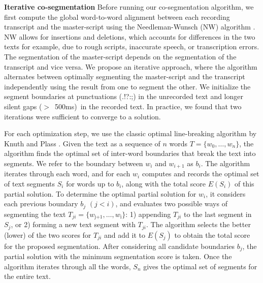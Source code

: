 \textbf{Iterative co-segmentation}
Before running our co-segmentation algorithm, we first compute the global word-to-word alignment between each recording transcript and the master-script using the Needleman-Wunsch (NW) algorithm \cite{needleman1970general}. NW allows for insertions and deletions, which accounts for differences in the two texts for example, due to rough scripts, inaccurate speech, or transcription errors.
%
The segmentation of the master-script depends on the segmentation of the transcript and vice versa. We propose an iterative approach, where the algorithm alternates between optimally segmenting the master-script and the transcript independently using the result from one to segment the other. We initialize the segment boundaries at punctuations (.!?:;) in the unrecorded text and longer silent gaps ($>$\ 500ms)\ in the recorded text. In practice, we
found that two iterations were sufficient to converge to a solution.


For each optimization step, we use the classic optimal line-breaking algorithm by Knuth and Plass \cite{knuth1981breaking}. Given the text as a sequence of $n$ words $T = \{w_0,\dots,w_n\}$, the algorithm finds the optimal set of inter-word
boundaries that break the text into segments. We refer to the boundary between $w_i$ and $w_{i+1}$ as
$b_i$.
%
The algorithm iterates through each word, and for each $w_i$
computes and records the optimal set of text segments $S_i$ for words up to $b_i$, along with the total score $E(S_i)$ of
this partial solution. To determine the optimal partial solution for $w_i$, it
considers each previous boundary $b_j$ $(j<i)$, and evaluates two possible ways of
segmenting the text $T_{ji} = \{w_\text{j+1},
\dots,w_\text{i}\}$: 1) appending $T_{ji}$ to the last segment in $S_j$, or 2) forming a new text segment with $T_{ji}$. The algorithm selects the better (lower) of the two scores for $T_{ji}$ and add it
to $E(S_j)$ to obtain the total score for the proposed
segmentation. After considering all candidate boundaries $b_j$, the partial solution with the minimum segmentation score is taken. Once the algorithm iterates through all the words, $S_n$ gives the
optimal set of segments for the entire text. 


